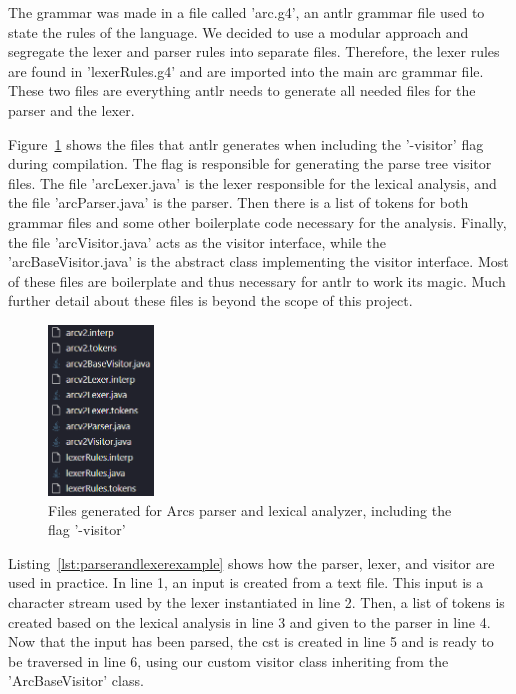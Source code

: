 The grammar was made in a file called 'arc.g4', an \gls{antlr} grammar file used to state the rules of the language. We decided to use a modular approach and segregate the lexer and parser rules into separate files. Therefore, the lexer rules are found in 'lexerRules.g4' and are imported into the main arc grammar file. These two files are everything \gls{antlr} needs to generate all needed files for the parser and the lexer.

Figure~\ref{fig:lexerandparserfiles} shows the files that \gls{antlr} generates when including the '-visitor' flag during compilation. The flag is responsible for generating the parse tree visitor files. The file 'arcLexer.java' is the lexer responsible for the lexical analysis, and the file 'arcParser.java' is the parser. Then there is a list of tokens for both grammar files and some other boilerplate code necessary for the analysis. Finally, the file 'arcVisitor.java' acts as the visitor interface, while the 'arcBaseVisitor.java' is the abstract class implementing the visitor interface. Most of these files are boilerplate and thus necessary for \gls{antlr} to work its magic. Much further detail about these files is beyond the scope of this project.


\begin{figure}[htb!]
    \begin{center}
        \includegraphics[width=0.25\textwidth]{figures/lexerAndParserFiles.png}
        \caption{Files generated for Arcs parser and lexical analyzer, including the flag '-visitor'}
        \label{fig:lexerandparserfiles}
    \end{center}
\end{figure}


Listing~\ref{lst:parserandlexerexample} shows how the parser, lexer, and visitor are used in practice. In line 1, an input is created from a text file. This input is a character stream used by the lexer instantiated in line 2. Then, a list of tokens is created based on the lexical analysis in line 3 and given to the parser in line 4. Now that the input has been parsed, the \gls{cst} is created in line 5 and is ready to be traversed in line 6, using our custom visitor class inheriting from the 'ArcBaseVisitor' class.


